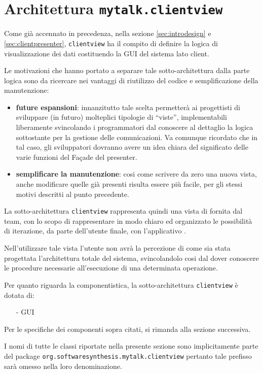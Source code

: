 \section{Architettura \texttt{mytalk.clientview}}\label{sec:clientview}
Come già accennato in precedenza, nella sezione \ref{sec:introdesign} e \ref{sec:clientpresenter}, \texttt{clientview} ha il compito di definire la logica di visualizzazione dei dati costituendo la GUI del sistema lato client.

Le motivazioni che hanno portato a separare tale sotto-architettura dalla parte logica sono da ricercare nei vantaggi di riutilizzo del codice e semplificazione della manutenzione:
\begin{itemize}
 	\item \textbf{future espansioni}: innanzitutto tale scelta permetterà ai progettisti di sviluppare (in futuro) molteplici tipologie di ``viste'', implementabili liberamente svincolando i programmatori dal conoscere al dettaglio la logica sottostante per la gestione delle comunicazioni. Va comunque ricordato che in tal caso, gli sviluppatori dovranno avere un idea chiara del significato delle varie funzioni del Façade del presenter.
 	\item \textbf{semplificare la manutenzione}: cosi come scrivere da zero una nuova vista, anche modificare quelle già presenti risulta essere più facile, per gli stessi motivi descritti al punto precedente.
\end{itemize}

La sotto-architettura \texttt{clientview} rappresenta quindi una vista di  fornita dal team, con lo scopo di rappresentare in modo chiaro ed organizzato le possibilità di iterazione, da parte dell'utente finale, con l'applicativo \caName.

Nell'utilizzare tale vista l'utente non avrà la percezione di come sia stata progettata l'architettura totale del sistema, svincolandolo cosi dal dover conoscere le procedure necessarie all'esecuzione di una determinata operazione.

Per quanto riguarda la componentistica, la sotto-architettura \texttt{clientview} è dotata di:
\begin{itemize}[noitemsep,nolistsep]
	\item[-] GUI
\end{itemize}

Per le specifiche dei componenti sopra citati, si rimanda alla sezione successiva.

I nomi di tutte le classi riportate nella presente sezione sono implicitamente parte del package \texttt{org.softwaresynthesis.mytalk.clientview} pertanto tale prefisso sarà omesso nella loro denominazione.

